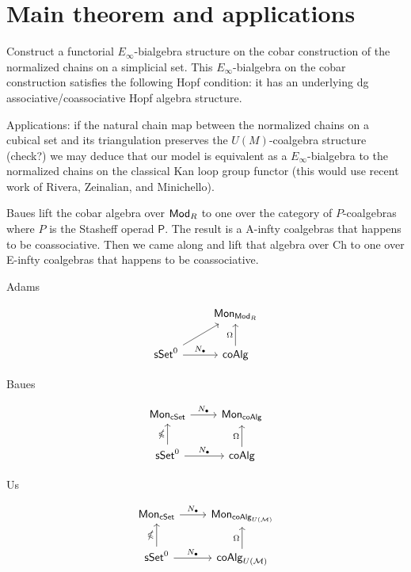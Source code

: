 
\section{Main theorem and applications}

Construct a functorial $E_{\infty}$-bialgebra structure on the cobar construction of the normalized chains on a simplicial set. This $E_{\infty}$-bialgebra on the cobar construction satisfies the following Hopf condition: it has an underlying dg associative/coassociative Hopf algebra structure. 

Applications: if the natural chain map between the normalized chains on a cubical set and its triangulation preserves the $U(M)$-coalgebra structure (check?) we may deduce that our model is equivalent as a $E_{\infty}$-bialgebra to the normalized chains on the classical Kan loop group functor (this would use recent work of Rivera, Zeinalian, and Minichello).


Baues lift the cobar algebra over $\mathsf{Mod}_R$ to one over the category of $P$-coalgebras where $P$ is the Stasheff operad $\mathsf P$. The result is a A-infty coalgebras that happens to be coassociative. Then we came along and lift that algebra over Ch to one over E-infty coalgebras that happens to be coassociative.


Adams

\begin{equation*}
\begin{tikzcd}
& \Mon_{\Ch} \\
\sSet^0 \arrow[ru] \arrow[r, "\chains"] & \coAlg \arrow[u, "\cobar"]
\end{tikzcd}
\end{equation*}

Baues 

\begin{equation*}
\begin{tikzcd}
\Mon_{\cSet} \arrow[r, "\chains"] & \Mon_{\coAlg} \\
\sSet^0 \arrow[r, "\chains"] \arrow[u, "\gcobar"] & \coAlg \arrow[u, "\cobar"]
\end{tikzcd}
\end{equation*}

Us

\begin{equation*}
\begin{tikzcd}
\Mon_{\cSet} \arrow[r, "\chains"] & \Mon_{\coAlg_{U(\M)}} \\
\sSet^0 \arrow[r, "\chains"] \arrow[u, "\gcobar"] & \coAlg_{U(\M)} \arrow[u, "\cobar"]
\end{tikzcd}
\end{equation*}